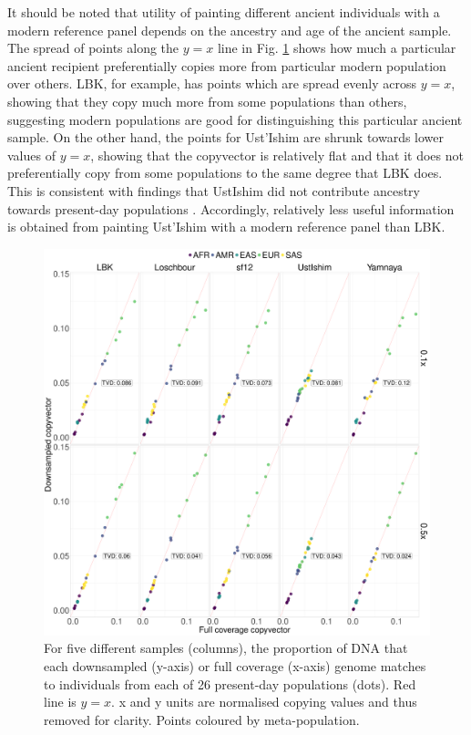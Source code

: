 It should be noted that utility of painting different ancient individuals with a modern reference panel depends on the ancestry and age of the ancient sample. The spread of points along the $y=x$ line in Fig. \ref{fig:CP_correlation_allSamples_0.1x_0.5x_30x_moderns} shows how much a particular ancient recipient preferentially copies more from particular modern population over others. LBK, for example, has points which are spread evenly across $y=x$, showing that they copy much more from some populations than others, suggesting modern populations are good for distinguishing this particular ancient sample. On the other hand, the points for Ust'Ishim are shrunk towards lower values of $y=x$, showing that the copyvector is relatively flat and that it does not preferentially copy from some populations to the same degree that LBK does. This is consistent with findings that UstIshim did not contribute ancestry towards present-day populations \cite{Fu2014}. Accordingly, relatively less useful information is obtained from painting Ust'Ishim with a modern reference panel than LBK.

\begin{figure}[htp]
    \centering
    \includegraphics[width=1.0\textwidth]{../images/chapter1/CP_correlation_allSamples_0.1x_0.5x_30x_moderns.pdf}
    \caption{For five different samples (columns), the proportion of DNA that each downsampled (y-axis) or full coverage (x-axis) genome matches to individuals from each of 26 present-day populations (dots). Red line is $y=x$. x and y units are normalised copying values and thus removed for clarity. Points coloured by meta-population.}
    \label{fig:CP_correlation_allSamples_0.1x_0.5x_30x_moderns}
\end{figure}


